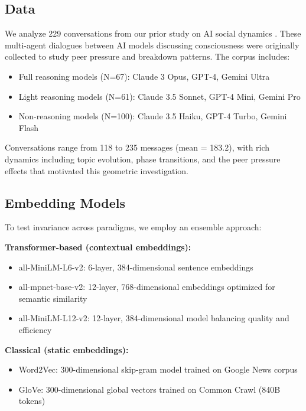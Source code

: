 \documentclass[11pt,letterpaper]{article}
\newcommand{\totalConversations}{229}
\newcommand{\minConvLength}{118}
\newcommand{\maxConvLength}{235}
\newcommand{\meanConvLength}{183.2}
\begin{document}
\subsection{Data}

We analyze \totalConversations{} conversations from our prior study on AI social dynamics \citep{garcia2025peer}. These multi-agent dialogues between AI models discussing consciousness were originally collected to study peer pressure and breakdown patterns. The corpus includes:

\begin{itemize}
\item Full reasoning models (N=67): Claude 3 Opus, GPT-4, Gemini Ultra
\item Light reasoning models (N=61): Claude 3.5 Sonnet, GPT-4 Mini, Gemini Pro
\item Non-reasoning models (N=100): Claude 3.5 Haiku, GPT-4 Turbo, Gemini Flash
\end{itemize}

Conversations range from \minConvLength{} to \maxConvLength{} messages (mean = \meanConvLength{}), with rich dynamics including topic evolution, phase transitions, and the peer pressure effects that motivated this geometric investigation.

\subsection{Embedding Models}

To test invariance across paradigms, we employ an ensemble approach:

\textbf{Transformer-based (contextual embeddings):}
\begin{itemize}
\item all-MiniLM-L6-v2: 6-layer, 384-dimensional sentence embeddings
\item all-mpnet-base-v2: 12-layer, 768-dimensional embeddings optimized for semantic similarity
\item all-MiniLM-L12-v2: 12-layer, 384-dimensional model balancing quality and efficiency
\end{itemize}

\textbf{Classical (static embeddings):}
\begin{itemize}
\item Word2Vec: 300-dimensional skip-gram model trained on Google News corpus
\item GloVe: 300-dimensional global vectors trained on Common Crawl (840B tokens)
\end{itemize}
\end{document}
